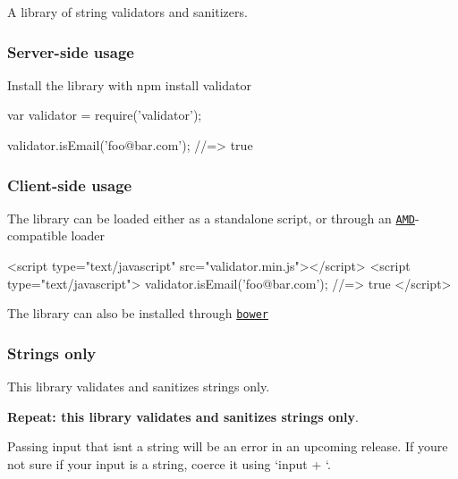 \href{https://npmjs.org/package/validator}{\tt } \href{https://travis-ci.org/chriso/validator.js}{\tt } \href{https://coveralls.io/r/chriso/validator.js}{\tt } \href{https://npmjs.org/package/validator}{\tt }

A library of string validators and sanitizers.

\subsubsection*{Server-\/side usage}

Install the library with {\ttfamily npm install validator}


\begin{DoxyCode}
var validator = require('validator');

validator.isEmail('foo@bar.com'); //=> true
\end{DoxyCode}


\subsubsection*{Client-\/side usage}

The library can be loaded either as a standalone script, or through an \href{http://requirejs.org/docs/whyamd.html}{\tt A\+MD}-\/compatible loader


\begin{DoxyCode}
<script type="text/javascript" src="validator.min.js"></script>
<script type="text/javascript">
  validator.isEmail('foo@bar.com'); //=> true
</script>
\end{DoxyCode}


The library can also be installed through \href{http://bower.io/}{\tt bower}




\subsubsection*{Strings only}

This library validates and sanitizes strings only.

{\bfseries Repeat\+: this library validates and sanitizes strings only}.

Passing input that isn\textquotesingle{}t a string will be an error in an upcoming release. If you\textquotesingle{}re not sure if your input is a string, coerce it using `input + \textquotesingle{}\textquotesingle{}`.

